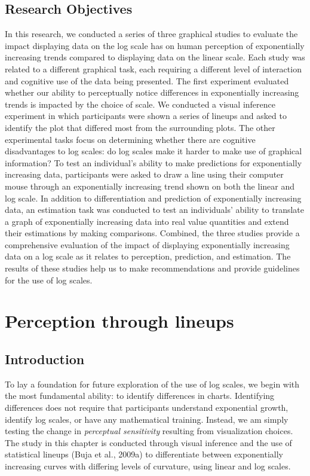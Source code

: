 \documentclass[print]{nuthesis}
\begin{document}
\hypertarget{research-objectives}{%
\section{Research Objectives}\label{research-objectives}}

In this research, we conducted a series of three graphical studies to evaluate the impact displaying data on the log scale has on human perception of exponentially increasing trends compared to displaying data on the linear scale.
Each study was related to a different graphical task, each requiring a different level of interaction and cognitive use of the data being presented.
The first experiment evaluated whether our ability to perceptually notice differences in exponentially increasing trends is impacted by the choice of scale.
We conducted a visual inference experiment in which participants were shown a series of lineups and asked to identify the plot that differed most from the surrounding plots.
The other experimental tasks focus on determining whether there are cognitive disadvantages to log scales: do log scales make it harder to make use of graphical information?
To test an individual's ability to make predictions for exponentially increasing data, participants were asked to draw a line using their computer mouse through an exponentially increasing trend shown on both the linear and log scale.
In addition to differentiation and prediction of exponentially increasing data, an estimation task was conducted to test an individuals' ability to translate a graph of exponentially increasing data into real value quantities and extend their estimations by making comparisons.
Combined, the three studies provide a comprehensive evaluation of the impact of displaying exponentially increasing data on a log scale as it relates to perception, prediction, and estimation.
The results of these studies help us to make recommendations and provide guidelines for the use of log scales.

\hypertarget{lineups}{%
\chapter{Perception through lineups}\label{lineups}}

\hypertarget{introduction}{%
\section{Introduction}\label{introduction}}

To lay a foundation for future exploration of the use of log scales, we begin with the most fundamental ability: to identify differences in charts. Identifying differences does not require that participants understand exponential growth, identify log scales, or have any mathematical training.
Instead, we am simply testing the change in \emph{perceptual sensitivity} resulting from visualization choices.
The study in this chapter is conducted through visual inference and the use of statistical lineups (Buja et al., 2009a) to differentiate between exponentially increasing curves with differing levels of curvature, using linear and log scales.
\end{document}
